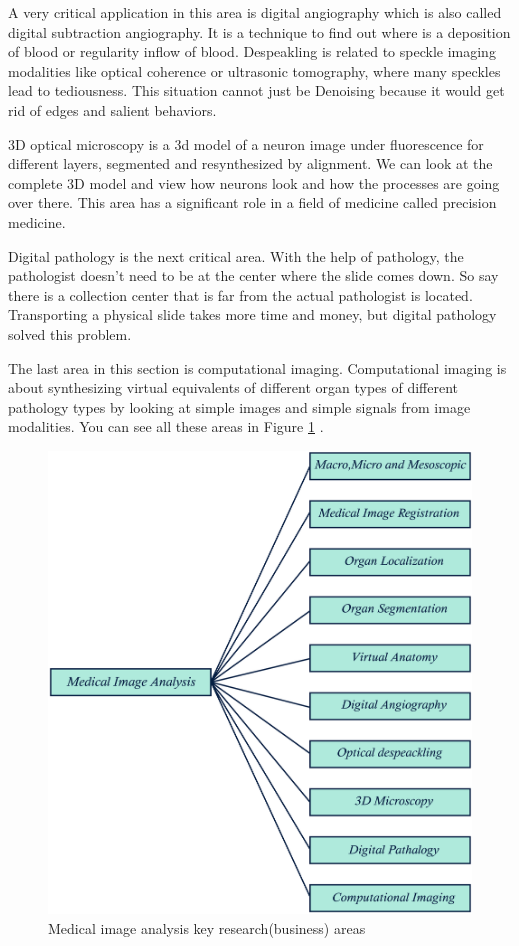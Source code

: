 A very critical application in this area is digital angiography which is also called digital subtraction angiography. It is a technique to find out where is a deposition of blood or regularity inflow of blood.  
Despeakling is related to speckle imaging modalities like optical coherence or ultrasonic tomography, where many speckles lead to tediousness. This situation cannot just be Denoising because it would get rid of edges and salient behaviors. 


3D optical microscopy is a 3d model of a neuron image under fluorescence for different layers, segmented and resynthesized by alignment. We can look at the complete 3D model and view how neurons look and how the processes are going over there. This area has a significant role in a field of medicine called precision medicine. 

Digital pathology is the next critical area. With the help of pathology, the pathologist doesn't need to be at the center where the slide comes down. So say there is a collection center that is far from the actual pathologist is located. Transporting a physical slide takes more time and money, but digital pathology solved this problem. 

The last area in this section is computational imaging. Computational imaging is about synthesizing virtual equivalents of different organ types of different pathology types by looking at simple images and simple signals from image modalities. You can see all these areas in Figure \ref{fig4} .


\begin{figure}[htbp]
	\includegraphics[width=1\columnwidth]{./figures/Fig4.png}
	\caption{Medical image analysis key research(business) areas}
	\label{fig4}
\end{figure}


